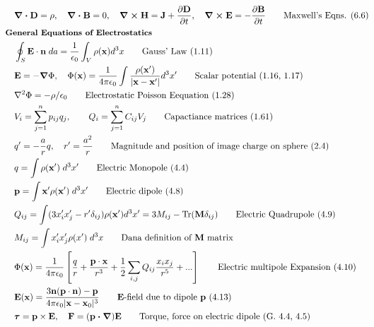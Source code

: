 \documentclass[10pt]{article}
\newcommand{\ve}[1]{\boldsymbol{\mathbf{#1}}}
\newcommand{\vect}[1]{\boldsymbol{\mathbf{#1}}}
\newcommand{\vc}[1]{\mathbf{#1}}
\newcommand{\eo}{\epsilon_0}
\newcommand{\pder}[2]{\frac{\partial #1}{\partial #2}}
\newcommand{\K}{\frac{1}{4 \pi \eo}}
\begin{document}
\begin{multicols}{2}
	\tiny
	\setlength{\abovedisplayskip}{-25pt}
	\setlength{\belowdisplayskip}{0pt}
	\setlength{\abovedisplayshortskip}{0pt}
	\setlength{\belowdisplayshortskip}{0pt}
	\begin{align*}
		& \ve{\nabla \cdot D} = \rho, \quad \ve{\nabla \cdot B} = 0, \quad \ve{\nabla \times H} = \ve{J}+\pder{\ve{D}}{t},\quad \ve{\nabla \times E} = - \pder{\ve{B}}{t} \tag*{Maxwell's Eqns. (6.6)}\\
	& \small \hspace{-10pt} \textbf{General Equations of Electrostatics} \small \\
		& \oint_S \vc{E} \cdot \vc{n} \; da = \frac{1}{\eo} \int_V \rho(\vc{x}) d^3x	\tag*{Gauss' Law (1.11)} \\
		& \ve{E} = -\ve{\nabla} \Phi, \quad \Phi(\vc{x}) = \K \int \frac{\rho (\vc{x}')}{|\vc{x} - \vc{x}'|} d^3 x' \tag*{Scalar potential (1.16, 1.17)} \\
		& \nabla^2 \Phi = -\rho/\eo	\tag*{Electrostatic Poisson Eequation (1.28)} \\
		& V_i = \sum_{j=1}^{n} p_{ij} q_j,  \qquad Q_i = \sum_{j=1}^{n} C_{ij} V_j  \tag*{Capactiance matrices (1.61)} \\
		& q' = -\frac{a}{r} q, \quad r' = \frac{a^2}{r}		\tag*{Magnitude and position of image charge on sphere (2.4)} \\
		& q = \int \rho(\vect{x}') \; d^3x'	\tag*{Electric Monopole (4.4)} \\
		& \vect{p} = \int \vect{x}' \rho(\vect{x}') \; d^3x'	\tag*{Electric dipole (4.8)} \\
		& Q_{ij} = \int (3 x_i' x_j'- r' \delta_{ij})\rho(\vect{x}') d^3x' = 3 M_{ij} - \text{Tr}(\vect{M} \delta_{ij})		\tag*{Electric Quadrupole (4.9)} \\
		& M_{ij} = \int x_i' x_j' \rho(x') \; d^3 x \tag*{Dana definition of $\ve{M}$ matrix} \\
		&\Phi(\vect{x}) = \K \left[ \frac{q}{r} + \frac{ \vect{p} \cdot \vect{x}}{r^3} + \frac{1}{2} \sum_{i,j} Q_{ij} \frac{x_i x_j}{r^5} + ... \right] \tag*{Electric multipole Expansion (4.10)} \\
		& \vect{E}(\vect{x}) = \frac{3 \vect{n}(\vect{p} \cdot \vect{n}) - \vect{p}}{4 \pi \eo |\vect{x} - \vect{x}_0|^3} \tag*{$\vect{E}$-field due to dipole $\vect{p}$ (4.13)} \\
		& \ve{\tau} = \ve{p} \times \ve{E}, \quad \ve{F} = (\ve{p \cdot \nabla}) \ve{E} \tag*{Torque, force on electric dipole (G. 4.4, 4.5)} \\

\end{align*}
\end{multicols}
\end{document}
